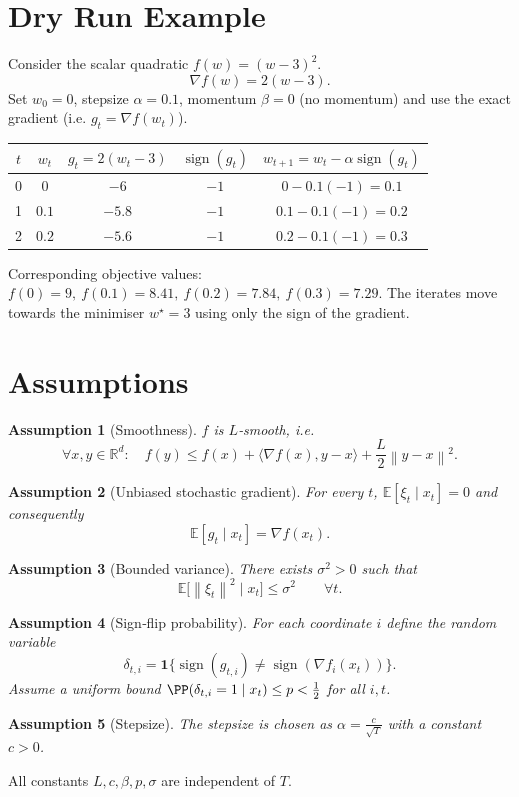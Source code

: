 \documentclass[11pt]{article}
\newtheorem{assumption}{Assumption}
\newcommand{\EE}{\mathbb{E}}
\newcommand{\RR}{\mathbb{R}}
\newcommand{\norm}[1]{\left\lVert#1\right\rVert}
\newcommand{\sign}{\operatorname{sign}}
\begin{document}
\section*{Dry Run Example}
Consider the scalar quadratic $f(w)=(w-3)^{2}$.
\[
\nabla f(w)=2(w-3).
\]
Set $w_{0}=0$, stepsize $\alpha=0.1$, momentum $\beta=0$ (no momentum) and use the exact gradient (i.e. $g_{t}=\nabla f(w_{t})$).

\begin{center}
\begin{tabular}{c|c|c|c|c}
$t$ & $w_{t}$ & $g_{t}=2(w_{t}-3)$ & $\sign(g_{t})$ & $w_{t+1}=w_{t}-\alpha\sign(g_{t})$ \\ \midrule
0 & $0$ & $-6$ & $-1$ & $0-0.1(-1)=0.1$ \\
1 & $0.1$ & $-5.8$ & $-1$ & $0.1-0.1(-1)=0.2$ \\
2 & $0.2$ & $-5.6$ & $-1$ & $0.2-0.1(-1)=0.3$ \\
\end{tabular}
\end{center}
Corresponding objective values:
$f(0)=9,\ f(0.1)=8.41,\ f(0.2)=7.84,\ f(0.3)=7.29$.  
The iterates move towards the minimiser $w^{\star}=3$ using only the sign of the gradient.

\section*{Assumptions}
\begin{assumption}[Smoothness]\label{ass:smooth}
$f$ is $L$‑smooth, i.e.
\[
\forall x,y\in\RR^{d}:\quad 
f(y)\le f(x)+\langle\nabla f(x),y-x\rangle+\frac{L}{2}\norm{y-x}^{2}.
\]
\end{assumption}
\begin{assumption}[Unbiased stochastic gradient]\label{ass:unbiased}
For every $t$, $\EE[\xi_{t}\mid x_{t}]=0$ and consequently
\[
\EE[g_{t}\mid x_{t}]=\nabla f(x_{t}).
\]
\end{assumption}
\begin{assumption}[Bounded variance]\label{ass:variance}
There exists $\sigma^{2}>0$ such that
\[
\EE\big[\norm{\xi_{t}}^{2}\mid x_{t}\big]\le \sigma^{2}\qquad\forall t.
\]
\end{assumption}
\begin{assumption}[Sign‑flip probability]\label{ass:signflip}
For each coordinate $i$ define the random variable
\[
\delta_{t,i}= \mathbf{1}\{\sign(g_{t,i})\neq \sign(\nabla f_{i}(x_{t}))\}.
\]
Assume a uniform bound $ \PP(\delta_{t,i}=1\mid x_{t})\le p<\tfrac12$ for all $i,t$.
\end{assumption}
\begin{assumption}[Stepsize]\label{ass:stepsize}
The stepsize is chosen as $\displaystyle \alpha=\frac{c}{\sqrt{T}}$ with a constant $c>0$.
\end{assumption}
All constants $L,c,\beta,p,\sigma$ are independent of $T$.
\end{document}
